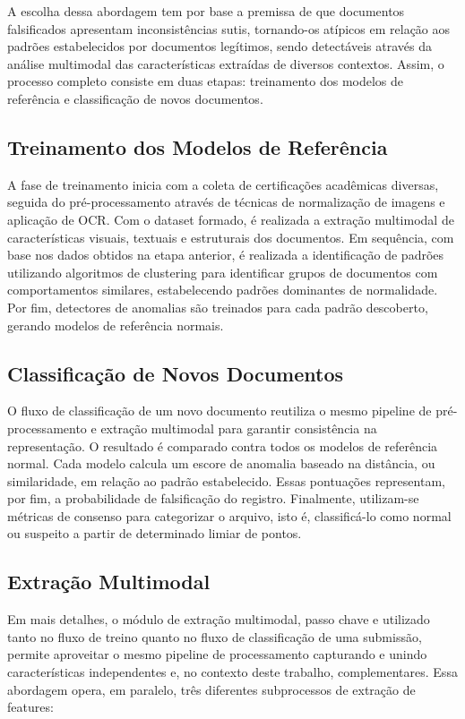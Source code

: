\documentclass[12pt]{article}
\begin{document}
A escolha dessa abordagem tem por base a premissa de que documentos falsificados apresentam inconsistências sutis, tornando-os atípicos em relação aos padrões estabelecidos por documentos legítimos, sendo detectáveis através da análise multimodal das características extraídas de diversos contextos. Assim, o processo completo consiste em duas etapas: treinamento dos modelos de referência e classificação de novos documentos.

\subsection{Treinamento dos Modelos de Referência}

A fase de treinamento inicia com a coleta de certificações acadêmicas diversas, seguida do pré-processamento através de técnicas de normalização de imagens e aplicação de OCR. Com o dataset formado, é realizada a extração multimodal de características visuais, textuais e estruturais dos documentos. Em sequência, com base nos dados obtidos na etapa anterior, é realizada a identificação de padrões utilizando algoritmos de clustering para identificar grupos de documentos com comportamentos similares, estabelecendo padrões dominantes de normalidade. Por fim, detectores de anomalias são treinados para cada padrão descoberto, gerando modelos de referência normais.

\subsection{Classificação de Novos Documentos}

O fluxo de classificação de um novo documento reutiliza o mesmo pipeline de pré-processamento e extração multimodal para garantir consistência na representação. O resultado é comparado contra todos os modelos de referência normal. Cada modelo calcula um escore de anomalia baseado na distância, ou similaridade, em relação ao padrão estabelecido. Essas pontuações representam, por fim, a probabilidade de falsificação do registro. Finalmente, utilizam-se métricas de consenso para categorizar o arquivo, isto é, classificá-lo como normal ou suspeito a partir de determinado limiar de pontos.

\subsection{Extração Multimodal}

Em mais detalhes, o módulo de extração multimodal, passo chave e utilizado tanto no fluxo de treino quanto no fluxo de classificação de uma submissão, permite aproveitar o mesmo pipeline de processamento capturando e unindo características independentes e, no contexto deste trabalho, complementares. Essa abordagem opera, em paralelo, três diferentes subprocessos de extração de features:
\end{document}
